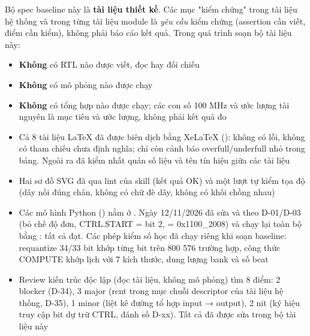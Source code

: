 \documentclass[10pt,a4paper]{article}
\begin{document}
\begin{notebox}[Phạm vi]
Bộ spec baseline này là \textbf{tài liệu thiết kế}. Các mục "kiểm chứng" trong tài liệu hệ thống và
trong từng tài liệu module là \emph{yêu cầu} kiểm chứng (assertion cần viết, điểm cần kiểm), không
phải báo cáo kết quả. Trong quá trình soạn bộ tài liệu này:
\begin{itemize}
\item \textbf{Không} có RTL nào được viết, đọc hay đối chiếu
\item \textbf{Không} có mô phỏng nào được chạy
\item \textbf{Không} có tổng hợp nào được chạy; các con số 100 MHz và ước lượng tài nguyên là mục tiêu và ước lượng, không phải kết quả đo
\item Cả 8 tài liệu LaTeX đã được biên dịch bằng XeLaTeX (): không có lỗi, không có tham chiếu chưa định nghĩa; chỉ còn cảnh báo overfull/underfull nhỏ trong bảng. Ngoài ra đã kiểm nhất quán số liệu và tên tín hiệu giữa các tài liệu
\item Hai sơ đồ SVG đã qua lint của skill  (kết quả OK) và một lượt tự kiểm tọa độ (dây nối đúng chân, không có chữ đè dây, không có khối chồng nhau)
\item Các mô hình Python () nằm ở . Ngày 12/11/2026 đã sửa  và  theo D-01/D-03 (bỏ chế độ đơn, CTRL.START = bit 2,  = 0x1100\_2008) và chạy lại toàn bộ bằng : tất cả đạt. Các phép kiểm số học đã chạy riêng khi soạn baseline: requantize 34/33 bit khớp từng bit trên 800 576 trường hợp, công thức COMPUTE khớp lịch với 7 kích thước, dung lượng bank và số beat
\item Review kiến trúc độc lập (đọc tài liệu, không mô phỏng) tìm 8 điểm: 2 blocker (D-34), 3 major (rcnt trong mục chuỗi descriptor của tài liệu hệ thống, D-35), 1 minor (liệt kê đường tổ hợp input → output), 2 nit (ký hiệu truy cập bit dự trữ CTRL, đánh số D-xx). Tất cả đã được sửa trong bộ tài liệu này
\end{itemize}
\end{notebox}
\end{document}
